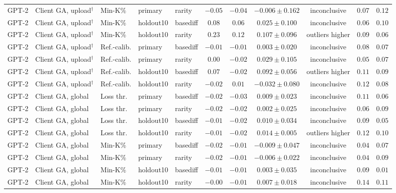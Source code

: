 \begin{table}[t]
\begin{tabular*}{\textwidth}{@{\extracolsep{\fill}}lllllcccccc@{}}
GPT-2 & Client GA, upload$^{\dagger}$ & Min-K\% & primary & rarity & $-0.05$ & $-0.04$ & $-0.006 \pm 0.162$ & inconclusive & $0.07$ & $0.12$ \\
GPT-2 & Client GA, upload$^{\dagger}$ & Min-K\% & holdout10 & basediff & $0.08$ & $0.06$ & $0.025 \pm 0.100$ & inconclusive & $0.06$ & $0.10$ \\
GPT-2 & Client GA, upload$^{\dagger}$ & Min-K\% & holdout10 & rarity & $0.23$ & $0.12$ & $0.107 \pm 0.096$ & outliers higher & $0.09$ & $0.06$ \\
GPT-2 & Client GA, upload$^{\dagger}$ & Ref.-calib. & primary & basediff & $-0.01$ & $-0.01$ & $0.003 \pm 0.020$ & inconclusive & $0.08$ & $0.07$ \\
GPT-2 & Client GA, upload$^{\dagger}$ & Ref.-calib. & primary & rarity & $0.00$ & $-0.02$ & $0.029 \pm 0.105$ & inconclusive & $0.05$ & $0.07$ \\
GPT-2 & Client GA, upload$^{\dagger}$ & Ref.-calib. & holdout10 & basediff & $0.07$ & $-0.02$ & $0.092 \pm 0.056$ & outliers higher & $0.11$ & $0.09$ \\
GPT-2 & Client GA, upload$^{\dagger}$ & Ref.-calib. & holdout10 & rarity & $-0.02$ & $0.01$ & $-0.032 \pm 0.080$ & inconclusive & $0.12$ & $0.08$ \\
GPT-2 & Client GA, global & Loss thr. & primary & basediff & $-0.02$ & $-0.03$ & $0.009 \pm 0.023$ & inconclusive & $0.11$ & $0.06$ \\
GPT-2 & Client GA, global & Loss thr. & primary & rarity & $-0.02$ & $-0.02$ & $0.002 \pm 0.025$ & inconclusive & $0.06$ & $0.09$ \\
GPT-2 & Client GA, global & Loss thr. & holdout10 & basediff & $-0.01$ & $-0.02$ & $0.010 \pm 0.034$ & inconclusive & $0.09$ & $0.05$ \\
GPT-2 & Client GA, global & Loss thr. & holdout10 & rarity & $-0.01$ & $-0.02$ & $0.014 \pm 0.005$ & outliers higher & $0.12$ & $0.10$ \\
GPT-2 & Client GA, global & Min-K\% & primary & basediff & $-0.02$ & $-0.01$ & $-0.009 \pm 0.047$ & inconclusive & $0.04$ & $0.07$ \\
GPT-2 & Client GA, global & Min-K\% & primary & rarity & $-0.02$ & $-0.01$ & $-0.006 \pm 0.022$ & inconclusive & $0.04$ & $0.09$ \\
GPT-2 & Client GA, global & Min-K\% & holdout10 & basediff & $-0.01$ & $-0.01$ & $0.003 \pm 0.035$ & inconclusive & $0.09$ & $0.01$ \\
GPT-2 & Client GA, global & Min-K\% & holdout10 & rarity & $-0.00$ & $-0.01$ & $0.007 \pm 0.018$ & inconclusive & $0.14$ & $0.11$ \\

\end{tabular*}
\end{table}
